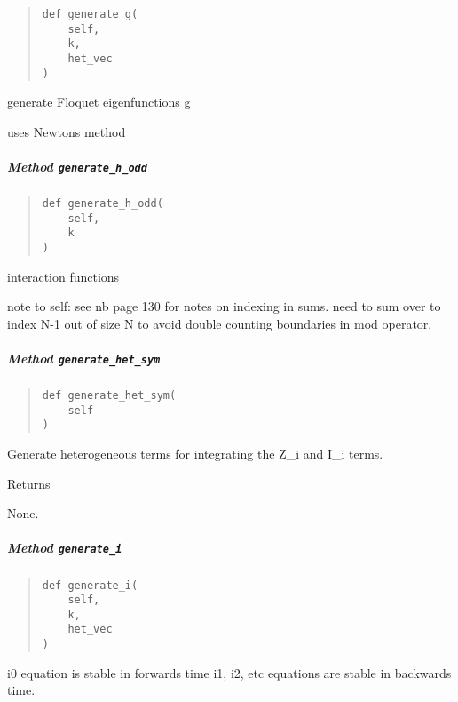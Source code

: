 \documentclass[
  english,
  a4paper,
  oneside]{article}
\begin{document}
\begin{quote}
\begin{verbatim}
def generate_g(
    self,
    k,
    het_vec
)
\end{verbatim}
\end{quote}

generate Floquet eigenfunctions g

uses Newtons method

\hypertarget{StrongCoupling.StrongCoupling.generate_h_odd}{%
\subparagraph{\texorpdfstring{Method
\texttt{generate\_h\_odd}}{Method generate\_h\_odd}}\label{StrongCoupling.StrongCoupling.generate_h_odd}}

\begin{quote}
\begin{verbatim}
def generate_h_odd(
    self,
    k
)
\end{verbatim}
\end{quote}

interaction functions

note to self: see nb page 130 for notes on indexing in sums. need to sum
over to index N-1 out of size N to avoid double counting boundaries in
mod operator.

\hypertarget{StrongCoupling.StrongCoupling.generate_het_sym}{%
\subparagraph{\texorpdfstring{Method
\texttt{generate\_het\_sym}}{Method generate\_het\_sym}}\label{StrongCoupling.StrongCoupling.generate_het_sym}}

\begin{quote}
\begin{verbatim}
def generate_het_sym(
    self
)
\end{verbatim}
\end{quote}

Generate heterogeneous terms for integrating the Z\_i and I\_i terms.

Returns

None.

\hypertarget{StrongCoupling.StrongCoupling.generate_i}{%
\subparagraph{\texorpdfstring{Method
\texttt{generate\_i}}{Method generate\_i}}\label{StrongCoupling.StrongCoupling.generate_i}}

\begin{quote}
\begin{verbatim}
def generate_i(
    self,
    k,
    het_vec
)
\end{verbatim}
\end{quote}

i0 equation is stable in forwards time i1, i2, etc equations are stable
in backwards time.
\end{document}
